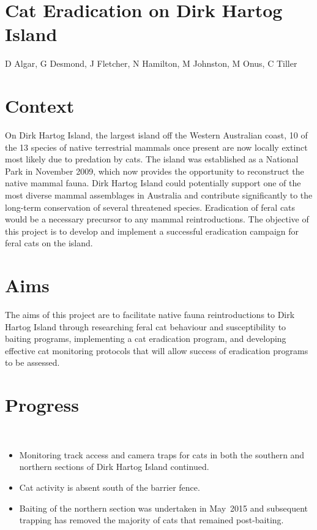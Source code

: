 \documentclass[version=last,
    paper=a4, %
    10pt, %
    usenames,
    dvipsnames,
    oneside, %
    headings=openany, %
    DIV=15 %
]{scrbook}
\begin{document}
\section*{Cat Eradication on Dirk Hartog Island
}

D Algar, G Desmond, J Fletcher, N Hamilton, M Johnston, M Onus, C Tiller


\section*{Context}
On Dirk Hartog Island, the largest island off the Western Australian
coast, 10 of the 13 species of native terrestrial mammals once present
are now locally extinct most likely due to predation by cats. The island
was established as a National Park in November 2009, which now provides
the opportunity to reconstruct the native mammal fauna. Dirk Hartog
Island could potentially support one of the most diverse mammal
assemblages in Australia and contribute significantly to the long-term
conservation of several threatened species. Eradication of feral cats
would be a necessary precursor to any mammal reintroductions. The
objective of this project is to develop and implement a successful
eradication campaign for feral cats on the island.



\section*{Aims}
The aims of this project are to facilitate native fauna reintroductions
to Dirk Hartog Island through researching feral cat behaviour and
susceptibility to baiting programs, implementing a cat eradication
program, and developing effective cat monitoring protocols that will
allow success of eradication programs to be assessed.



\section*{Progress}
~

\begin{itemize}
\itemsep1pt\parskip0pt
\item
  Monitoring track access and camera traps for cats in both the southern
  and northern sections of Dirk Hartog Island continued.
\item
  Cat activity is absent south of the barrier fence.
\item
  Baiting of the northern section was undertaken in May~2015 and
  subsequent trapping has removed the majority of cats that remained
  post-baiting.~
\end{itemize}
\end{document}
